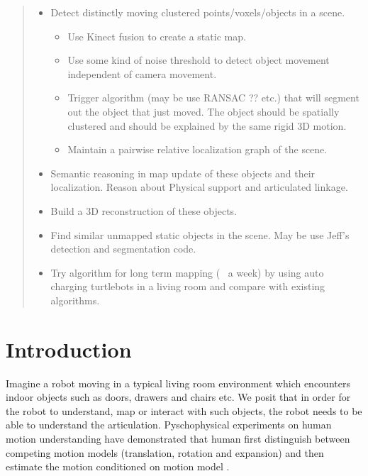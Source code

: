 \documentclass[conference]{IEEEtran}
\begin{document}
\IEEEpeerreviewmaketitle
\begin{abstract}
\begin{itemize}
  \item Detect distinctly moving clustered points/voxels/objects in a scene.
    \begin{itemize}
      \item Use Kinect fusion to create a static map.
      \item Use some kind of noise threshold to detect object movement
        independent of camera movement.
      \item Trigger algorithm (may be use RANSAC ?? etc.) that will segment out
        the object that just moved. The object should be spatially clustered
        and should be explained by the same rigid 3D motion. 
      \item Maintain a pairwise relative localization graph of the scene.
    \end{itemize}
  \item Semantic reasoning in map update of these objects and their
    localization.  Reason about Physical support and articulated linkage.
  \item Build a 3D reconstruction of these objects.
  \item Find similar unmapped static objects in the scene. May be use Jeff's
    detection and segmentation code.
  \item Try algorithm for long term mapping (~ a week) by using auto charging
    turtlebots in a living room and compare with existing algorithms.
\end{itemize}
\end{abstract}


\section{Introduction}
Imagine a robot moving in a typical living room environment which encounters indoor objects such as doors, drawers and chairs etc. We posit that in order for the robot to understand, map or interact with such objects, the robot needs to be able to understand the articulation. Pyschophysical experiments on human motion understanding have demonstrated that human first distinguish between competing motion models (translation, rotation and expansion) and then estimate the motion conditioned on motion model \cite{NIPS2008_3458}.
\end{document}
